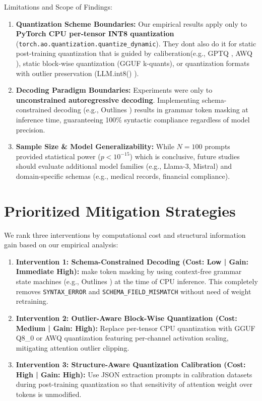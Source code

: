\documentclass[10pt,journal,compsoc]{IEEEtran}
\newcommand{\errSyn}{\texttt{SYNTAX\_\allowbreak ERROR}}
\newcommand{\errField}{\texttt{SCHEMA\_\allowbreak FIELD\_\allowbreak MISMATCH}}
\begin{document}
Limitations and Scope of Findings:

\begin{enumerate}
    \item \textbf{Quantization Scheme Boundaries:} Our empirical results apply only to \textbf{PyTorch CPU per-tensor INT8 quantization} (\texttt{torch.ao.quantization.}\allowbreak\texttt{quantize\_dynamic}). They dont also do it for static post-training quantization that is guided by caliberation(e.g., GPTQ \cite{frantar2023gptq}, AWQ \cite{lin2024awq}), static block-wise quantization (GGUF k-quants), or quantization formats with outlier preservation (LLM.int8() \cite{dettmers2022llmint8}).
    \item \textbf{Decoding Paradigm Boundaries:} Experiments were only to \textbf{unconstrained autoregressive decoding}. Implementing schema-constrained decoding (e.g., Outlines \cite{willard2023outlines}) results in grammar token masking at inference time, guaranteeing 100\% syntactic compliance regardless of model precision.
    \item \textbf{Sample Size \& Model Generalizability:} While $N=100$ prompts provided statistical power ($p < 10^{-15}$) which is conclusive, future studies should evaluate additional model families (e.g., Llama-3, Mistral) and domain-specific schemas (e.g., medical records, financial compliance).
\end{enumerate}

\section{Prioritized Mitigation Strategies}

We rank three interventions by computational cost and structural information gain based on our empirical analysis:

\begin{enumerate}
    \item \textbf{Intervention 1: Schema-Constrained Decoding (Cost: Low | Gain: Immediate High):} make token masking by using context-free grammar state machines (e.g., Outlines \cite{willard2023outlines}) at the time of CPU inference. This completely removes \errSyn{} and \errField{} without need of weight retraining.
    \item \textbf{Intervention 2: Outlier-Aware Block-Wise Quantization (Cost: Medium | Gain: High):} Replace per-tensor CPU quantization with GGUF Q8\_0 or AWQ quantization featuring per-channel activation scaling, mitigating attention outlier clipping.
    \item \textbf{Intervention 3: Structure-Aware Quantization Calibration (Cost: High | Gain: High):} Use JSON extraction prompts in calibration datasets during post-training quantization so that sensitivity of attention weight over tokens is unmodified.
\end{enumerate}
\end{document}
